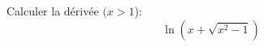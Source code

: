 Calculer la d\'eriv\'ee $(x>1$):
\begin{displaymath}
 \ln\left( x+\sqrt{x^2-1}\right) 
\end{displaymath}
\bigskip
